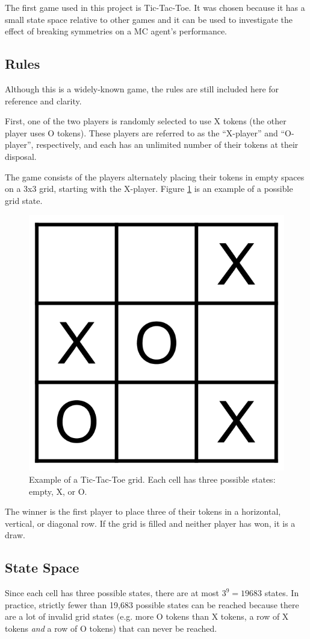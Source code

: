 \documentclass[11pt,a4paper]{report}
\begin{document}
The first game used in this project is Tic-Tac-Toe. It was chosen because it has a small state space relative to other games and it can be used to investigate the effect of breaking symmetries on a MC agent's performance.


\subsection{Rules}

Although this is a widely-known game, the rules \cite{tic-tac-toe-rules} are still included here for reference and clarity.

First, one of the two players is randomly selected to use X tokens (the other player uses O tokens). These players are referred to as the ``X-player'' and ``O-player'', respectively, and each has an unlimited number of their tokens at their disposal.

The game consists of the players alternately placing their tokens in empty spaces on a 3x3 grid, starting with the X-player. Figure \ref{tic-tac-toe-grid-example} is an example of a possible grid state.

\begin{figure}[htbp]
	\begin{center}
		\includegraphics[width=0.3\linewidth]{tictactoe_grid_example.png}
		\caption{Example of a Tic-Tac-Toe grid. Each cell has three possible states: empty, X, or O.}
		\label{tic-tac-toe-grid-example}
	\end{center}
\end{figure}

The winner is the first player to place three of their tokens in a horizontal, vertical, or diagonal row. If the grid is filled and neither player has won, it is a draw.


\subsection{State Space}
\label{sec:TicTacToeStateSpace}

Since each cell has three possible states, there are at most $3^9 = 19683$ states. In practice, strictly fewer than 19,683 possible states can be reached because there are a lot of invalid grid states (e.g. more O tokens than X tokens, a row of X tokens \emph{and} a row of O tokens) that can never be reached.
\end{document}
